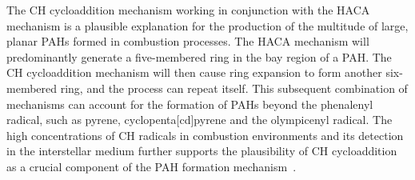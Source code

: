 \documentclass[journal=jacsat,manuscript=article,layout=onecolumn]{achemso}
\begin{document}
The CH cycloaddition mechanism working in conjunction with the HACA mechanism is a plausible explanation for the production of the multitude of large, planar PAHs formed in combustion processes. The HACA mechanism will predominantly generate a five-membered ring in the bay region of a PAH. The CH cycloaddition mechanism will then cause ring expansion to form another six-membered ring, and the process can repeat itself. This subsequent combination of mechanisms can account for the formation of PAHs beyond the phenalenyl radical, such as pyrene, cyclopenta[cd]pyrene and the olympicenyl radical. The high concentrations of CH radicals in combustion environments and its detection in the interstellar medium further supports the plausibility of CH cycloaddition as a crucial component of the PAH formation mechanism~\cite{lov11,tin11,zha12,ger10,ada41}.






\end{document}
